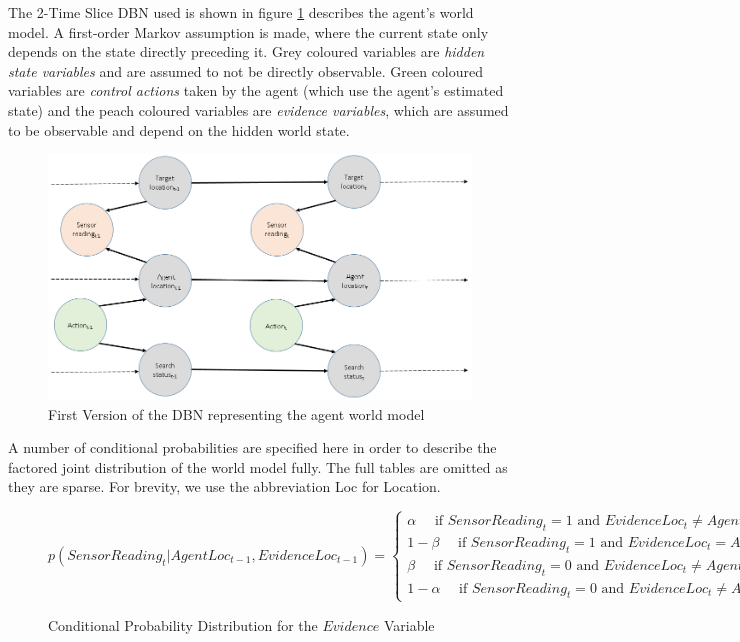 The 2-Time Slice DBN used is shown in figure \ref{fig:FirstDBNUsed} describes the agent's world model. A first-order Markov assumption is made, where the current state only depends on the state directly preceding it. Grey coloured variables are \textit{hidden state variables} and are assumed to not be directly observable. Green coloured variables are \textit{control actions} taken by the agent (which use the agent's estimated state) and the peach coloured variables are \textit{evidence variables}, which are assumed to be observable and depend on the hidden world state. 
\begin{figure}
    \centering
    \includegraphics[width = 0.8\linewidth]{Chapters/MultiAgentTargetDetection/Figs/DBNWithMultipleHiddenState.PNG}
     \caption{First Version of the DBN representing the agent world model}
    \label{fig:FirstDBNUsed}
\end{figure}
A number of conditional probabilities are specified here in order to describe the factored joint distribution of the world model fully. The full tables are omitted as they are sparse. For brevity, we use the abbreviation Loc for Location.



\begin{figure}[H]
\scriptsize
\begin{equation}\label{eqn:EvidenceVarsProbs}
    p(SensorReading_t | AgentLoc_{t-1}, EvidenceLoc_{t-1})  = 
    \begin{cases}
    \alpha \quad \text{ if } SensorReading_t=1 \text{ and } EvidenceLoc_t \neq AgentLoc_t
    \\
    1-\beta \quad \text{ if } SensorReading_t=1 \text{ and } EvidenceLoc_t = AgentLoc_t
    \\
    \beta \quad \text{ if } SensorReading_t=0 \text{ and } EvidenceLoc_t \neq AgentLoc_t
    \\
    1-\alpha \quad \text{ if } SensorReading_t=0 \text{ and } EvidenceLoc_t \neq AgentLoc_t
    \end{cases}
\end{equation}
\caption{Conditional Probability Distribution for the $Evidence$ Variable}
\end{figure}


